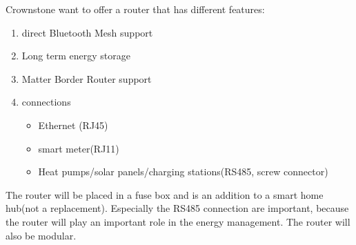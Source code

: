 Crownstone want to offer a router that has different features:
\begin{enumerate}
    \item direct Bluetooth Mesh support
    \item Long term energy storage
    \item Matter Border Router support
    \item connections 
    \begin{itemize}
        \item Ethernet (RJ45)
        \item smart meter(RJ11)
        \item Heat pumps/solar panels/charging stations(RS485, screw connector)
    \end{itemize}
\end{enumerate}
The router will be placed in a fuse box and is an addition to a smart home hub(not a replacement). Especially the RS485 connection are important, because the router will play an important role in the energy management. The router will also be modular.
